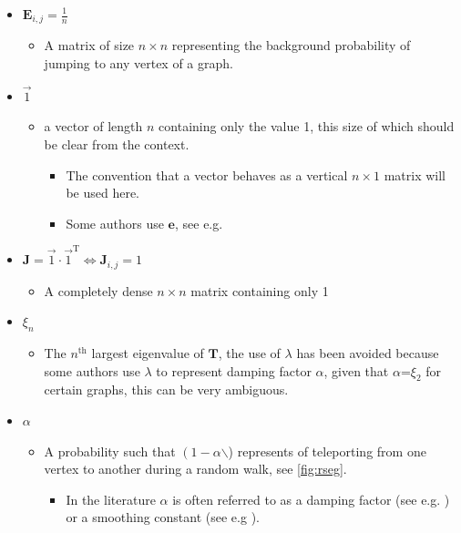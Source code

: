 \documentclass[11pt]{article}
\begin{document}
\begin{itemize}
\begin{itemize}
\end{itemize}
\item \(\mathbf{E}_{i,j} = \frac{1}{n}\)
\begin{itemize}
\item A matrix of size \(n\times n\) representing the background probability of jumping to any vertex of a graph.
\end{itemize}
\item \(\vec{1}\)
\begin{itemize}
\item a vector of length \(n\) containing only the value 1, this size of which should be clear from the context.
\begin{itemize}
\item The convention that a vector behaves as a vertical \(n \times 1\) matrix will be used here.
\item Some authors use \(\mathbf{e}\), see e.g. \cite{langvilleGooglePageRankScience2012}
\end{itemize}
\end{itemize}
\item \(\mathbf{J} = \vec{1}\cdot \vec{1}^{\mathrm{T}} \iff \mathbf{J}_{i,j} = 1\)
\begin{itemize}
\item A completely dense \(n \times n\) matrix containing only 1
\end{itemize}
\item \(\xi_{n}\)
\begin{itemize}
\item The \(n^{\mathrm{th}}\) largest eigenvalue of \(\mathbf{T}\), the use of \(\lambda\) has been avoided because some authors use \(\lambda\) to represent damping factor \(\alpha\), given that \(\alpha\)=\(\xi_{2}\) for certain graphs, this can be very ambiguous.
\end{itemize}
\item \(\alpha\)
\begin{itemize}
\item A probability such that \(\left(1-\alpha\)$\backslash$) represents of teleporting from one vertex to another during a random walk, see \ref{fig:rseg}.
\begin{itemize}
\item In the literature \(\alpha\) is often referred to as a damping factor (see e.g.  \cite{berkhoutRankingNodesGeneral2018a,brinkmeierPageRankRevisited2006a,fuDampingFactorGoogle2006,kamvarAdaptiveMethodsComputation2004b,bianchiniPageRank2005}) or a smoothing constant (see e.g \cite{koppelMeasuringDirectIndirect2014}).
\end{itemize}
\end{itemize}
\end{itemize}
\end{document}
